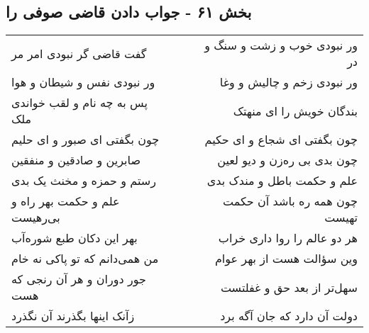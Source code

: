 \begin{center}
\section*{بخش ۶۱ - جواب دادن قاضی صوفی را}
\label{sec:sh061}
\begin{longtable}{l p{0.5cm} r}
گفت قاضی گر نبودی امر مر
&&
ور نبودی خوب و زشت و سنگ و در
\\
ور نبودی نفس و شیطان و هوا
&&
ور نبودی زخم و چالیش و وغا
\\
پس به چه نام و لقب خواندی ملک
&&
بندگان خویش را ای منهتک
\\
چون بگفتی ای صبور و ای حلیم
&&
چون بگفتی ای شجاع و ای حکیم
\\
صابرین و صادقین و منفقین
&&
چون بدی بی ره‌زن و دیو لعین
\\
رستم و حمزه و مخنث یک بدی
&&
علم و حکمت باطل و مندک بدی
\\
علم و حکمت بهر راه و بی‌رهیست
&&
چون همه ره باشد آن حکمت تهیست
\\
بهر این دکان طبع شوره‌آب
&&
هر دو عالم را روا داری خراب
\\
من همی‌دانم که تو پاکی نه خام
&&
وین سؤالت هست از بهر عوام
\\
جور دوران و هر آن رنجی که هست
&&
سهل‌تر از بعد حق و غفلتست
\\
زآنک اینها بگذرند آن نگذرد
&&
دولت آن دارد که جان آگه برد
\\
\end{longtable}
\end{center}
